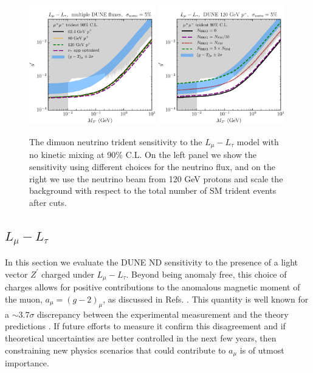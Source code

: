 \begin{figure}[t]
\centering
  \includegraphics[width=0.49\textwidth]{lmultau_fluxes.pdf}
 \includegraphics[width=0.49\textwidth]{lmultau_bkgs.pdf}
 \caption[DUNE sensitivity to a $L_\mu - L_\tau$ $Z^\prime$ with alternative assumptions.]{The dimuon neutrino trident sensitivity to the $L_\mu - L_\tau$ model with no kinetic mixing at 90\% C.L. On the left panel we show the sensitivity using different choices for the neutrino flux, and on the right we use the neutrino beam from 120 GeV protons and scale the background with respect to the total number of SM trident events after cuts.\label{fig:Lmu_Ltau_varied}}
\end{figure}
%

\subsection{\boldmath$L_\mu - L_\tau$ \label{sec:lmu_ltau}}

In this section we evaluate the DUNE ND sensitivity to the presence of a light
vector $Z^\prime$ charged under $L_{\mu} - L_{\tau}$. Beyond being anomaly free, this choice of charges allows for positive contributions to the anomalous magnetic moment of the muon, $a_\mu = (g-2)_{\mu}$, as discussed in Refs. \cite{Baek:2001kca,Pospelov:2008zw,Kamada:2015era,Araki:2015mya,Kamada:2018zxi}. This quantity is well known for a $\sim 3.7\sigma$ discrepancy between the experimental measurement \cite{Bennett:2006fi} and the theory predictions \cite{Blum:2018mom,Keshavarzi:2018mgv}. If future efforts to measure it \cite{Grange:2015fou} confirm this disagreement and if theoretical uncertainties are better controlled in the next few years, then constraining new physics scenarios that could contribute to $a_\mu$ is of utmost importance. 

